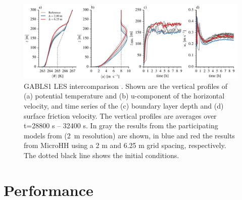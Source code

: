 \documentclass[gmd]{copernicus}
\begin{document}
\begin{figure}[t]
\vspace*{2mm}
\begin{center}
\includegraphics[width=16.6cm]{figs/gmd_gabls_prof_tser.pdf}
\end{center}
\caption{GABLS1 LES intercomparison \citep{Beare2006}. Shown are the vertical profiles of (a) potential temperature and (b) u-component of the horizontal velocity, and time series of the (c) boundary layer depth and (d) surface friction velocity. The vertical profiles are averages over t=28800 s -- 32400 s. In gray the results from the participating models from  \citep{Beare2006} (2~m resolution) are shown, in blue and red the results from MicroHH using a 2 m and 6.25 m grid spacing, respectively. The dotted black line shows the initial conditions.}
\label{fig:gabls}
\end{figure}

\section{Performance}\label{sec:performance}
\end{document}
